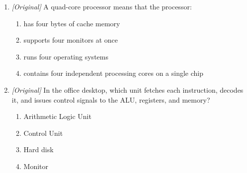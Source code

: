 \begin{enumerate}[label=\textbf{Q\arabic*.}, leftmargin=*]
\begin{enumerate}[label=\Alph*.]
    \item the address of the memory location to access
    \item the instruction to be decoded
    \item condition flags such as zero, carry, and sign
    \item the data to be written to memory
  \end{enumerate}
\item \textit{[Original]} A quad-core processor means that the processor:
  \begin{enumerate}[label=\Alph*.]
    \item has four bytes of cache memory
    \item supports four monitors at once
    \item runs four operating systems
    \item contains four independent processing cores on a single chip
  \end{enumerate}
\item \textit{[Original]} In the office desktop, which unit fetches each
  instruction, decodes it, and issues control signals to the ALU, registers,
  and memory?
  \begin{enumerate}[label=\Alph*.]
    \item Arithmetic Logic Unit
    \item Control Unit
    \item Hard disk
    \item Monitor
  \end{enumerate}


\end{enumerate}
